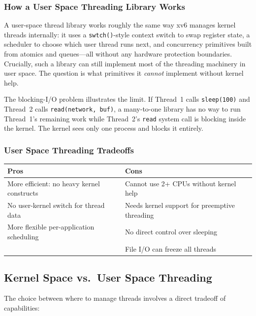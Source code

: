 \documentclass[11pt]{article}
\begin{document}
\subsubsection*{How a User Space Threading Library Works}

A user-space thread library works roughly the same way xv6 manages kernel threads internally: it uses a \texttt{swtch()}-style context switch to swap register state, a scheduler to choose which user thread runs next, and concurrency primitives built from atomics and queues---all without any hardware protection boundaries. Crucially, such a library can still implement most of the threading machinery in user space. The question is what primitives it \emph{cannot} implement without kernel help.

The blocking-I/O problem illustrates the limit. If Thread~1 calls \texttt{sleep(100)} and Thread~2 calls \texttt{read(network, buf)}, a many-to-one library has no way to run Thread~1's remaining work while Thread~2's \texttt{read} system call is blocking inside the kernel. The kernel sees only one process and blocks it entirely.

\subsubsection*{User Space Threading Tradeoffs}

\begin{center}
\begin{tabular}{ll}
\toprule
\textbf{Pros} & \textbf{Cons} \\
\midrule
More efficient: no heavy kernel constructs & Cannot use 2+ CPUs without kernel help \\
No user-kernel switch for thread data & Needs kernel support for preemptive threading \\
More flexible per-application scheduling & No direct control over sleeping \\
 & File I/O can freeze all threads \\
\bottomrule
\end{tabular}
\end{center}

\subsection{Kernel Space vs.\ User Space Threading}

The choice between where to manage threads involves a direct tradeoff of capabilities:
\end{document}
